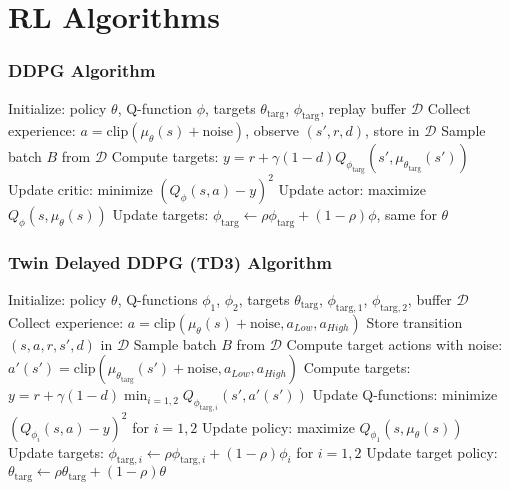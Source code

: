 \section{RL Algorithms}
\begin{frame}
    \frametitle{DDPG Algorithm}
        \begin{algorithmic}[1]
    \STATE Initialize: policy $\theta$, Q-function $\phi$, targets $\theta_{\text{targ}}$, $\phi_{\text{targ}}$, replay buffer $\mathcal{D}$
    \REPEAT
        \STATE Collect experience: $a = \text{clip}(\mu_{\theta}(s) + \text{noise})$, observe $(s',r,d)$, store in $\mathcal{D}$
        \STATE Sample batch $B$ from $\mathcal{D}$
        \STATE Compute targets: $y = r + \gamma (1-d) Q_{\phi_{\text{targ}}}(s', \mu_{\theta_{\text{targ}}}(s'))$
        \STATE Update critic: minimize $(Q_{\phi}(s,a) - y)^2$
        \STATE Update actor: maximize $Q_{\phi}(s, \mu_{\theta}(s))$
        \STATE Update targets: $\phi_{\text{targ}} \leftarrow \rho \phi_{\text{targ}} + (1-\rho) \phi$, same for $\theta$
    \end{algorithmic}
\end{frame}

\begin{frame}
    \frametitle{Twin Delayed DDPG (TD3) Algorithm}
    \vspace{-0.25cm}
        \begin{algorithmic}[1]
    \STATE Initialize: policy $\theta$, Q-functions $\phi_1$, $\phi_2$, targets $\theta_{\text{targ}}$, $\phi_{\text{targ},1}$, $\phi_{\text{targ},2}$, buffer $\mathcal{D}$
    \REPEAT
        \STATE Collect experience: $a = \text{clip}(\mu_{\theta}(s) + \text{noise}, a_{Low}, a_{High})$
        \STATE Store transition $(s,a,r,s',d)$ in $\mathcal{D}$
            \STATE Sample batch $B$ from $\mathcal{D}$
            \STATE Compute target actions with noise: $a'(s') = \text{clip}(\mu_{\theta_{\text{targ}}}(s') + \text{noise}, a_{Low}, a_{High})$
            \STATE Compute targets: $y = r + \gamma (1-d) \min_{i=1,2} Q_{\phi_{\text{targ},i}}(s', a'(s'))$
            \STATE Update Q-functions: minimize $(Q_{\phi_i}(s,a) - y)^2$ for $i=1,2$
                \STATE Update policy: maximize $Q_{\phi_1}(s, \mu_{\theta}(s))$
                \STATE Update targets: $\phi_{\text{targ},i} \leftarrow \rho \phi_{\text{targ},i} + (1-\rho) \phi_i$ for $i=1,2$
                \STATE Update target policy: $\theta_{\text{targ}} \leftarrow \rho \theta_{\text{targ}} + (1-\rho) \theta$
        \ENDIF
    \end{algorithmic}
\end{frame}

